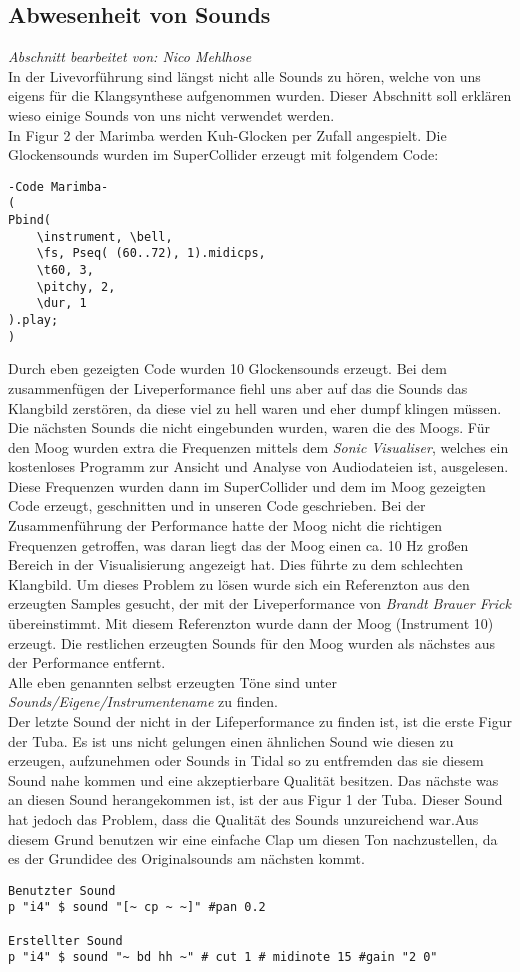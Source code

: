 \documentclass[
10pt, %
a4paper, %
oneside, %
headinclude,footinclude, %
BCOR5mm, %
]{scrartcl}
\begin{document}
\subsection{Abwesenheit von Sounds}
\textit{Abschnitt bearbeitet von: Nico Mehlhose}\\
In der Livevorführung sind längst nicht alle Sounds zu hören, welche von uns eigens für die Klangsynthese aufgenommen wurden. Dieser Abschnitt soll erklären wieso einige Sounds von uns nicht verwendet werden.\\
In Figur 2 der Marimba werden Kuh-Glocken per Zufall angespielt. Die Glockensounds wurden im SuperCollider erzeugt mit folgendem Code:
\begin{lstlisting}
-Code Marimba-
(
Pbind(
	\instrument, \bell,
	\fs, Pseq( (60..72), 1).midicps,
	\t60, 3,
	\pitchy, 2,
	\dur, 1
).play;
)
\end{lstlisting}
Durch eben gezeigten Code wurden 10 Glockensounds erzeugt. Bei dem zusammenfügen der Liveperformance fiehl uns aber auf das die Sounds das Klangbild zerstören, da diese viel zu hell waren und eher dumpf klingen müssen.\\
Die nächsten Sounds die nicht eingebunden wurden, waren die des Moogs. Für den Moog wurden extra die Frequenzen mittels dem \textit{Sonic Visualiser}, welches ein kostenloses Programm zur Ansicht und Analyse von Audiodateien ist, ausgelesen.\cite{Sonic} Diese Frequenzen wurden dann im SuperCollider und dem im Moog gezeigten Code erzeugt, geschnitten und in unseren Code geschrieben. Bei der Zusammenführung der Performance hatte der Moog nicht die richtigen Frequenzen getroffen, was daran liegt das der Moog einen ca. 10 Hz großen Bereich in der Visualisierung angezeigt hat. Dies führte zu dem schlechten Klangbild. Um dieses Problem zu lösen wurde sich ein Referenzton aus den erzeugten Samples gesucht, der mit der Liveperformance von \textit{Brandt Brauer Frick} übereinstimmt. Mit diesem Referenzton wurde dann der Moog (Instrument 10) erzeugt. Die restlichen erzeugten Sounds für den Moog wurden als nächstes aus der Performance entfernt.\\
Alle eben genannten selbst erzeugten Töne sind unter \textit{Sounds/Eigene/Instrumentename} zu finden.\\
Der letzte Sound der nicht in der Lifeperformance zu finden ist, ist die erste Figur der Tuba. Es ist uns nicht gelungen einen ähnlichen Sound wie diesen zu erzeugen, aufzunehmen oder Sounds in Tidal so zu entfremden das sie diesem Sound nahe kommen und eine akzeptierbare Qualität besitzen. Das nächste was an diesen Sound herangekommen ist, ist der aus Figur 1 der Tuba. Dieser Sound hat jedoch das Problem, dass die Qualität des Sounds unzureichend war.Aus diesem Grund benutzen wir eine einfache Clap um diesen Ton nachzustellen, da es der Grundidee des Originalsounds am nächsten kommt.
\begin{lstlisting}
Benutzter Sound
p "i4" $ sound "[~ cp ~ ~]" #pan 0.2

Erstellter Sound
p "i4" $ sound "~ bd hh ~" # cut 1 # midinote 15 #gain "2 0"

\end{lstlisting}
\end{document}

